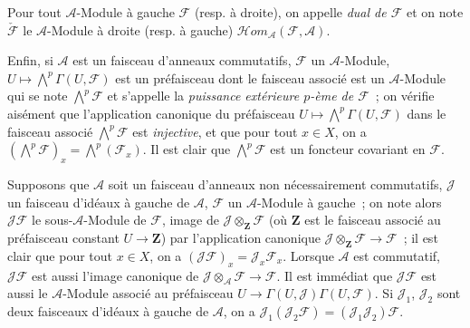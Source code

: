 \begin{env}[4.1.5]
Pour tout $\mathcal{A}$-Module à gauche $\mathcal{F}$ (resp. à droite), on
appelle \emph{dual de $\mathcal{F}$} et on note $\check{\mathcal{F}}$ le
$\mathcal{A}$-Module à droite (resp. à gauche)
$\mathcal{H}\!om_{\mathcal{A}}(\mathcal{F},\mathcal{A})$.

Enfin, si $\mathcal{A}$ est un faisceau d'anneaux commutatifs,
$\mathcal{F}$ un $\mathcal{A}$-Module,
$U\mapsto\bigwedge^p\Gamma(U,\mathcal{F})$ est un préfaisceau dont le
faisceau associé est un $\mathcal{A}$-Module qui se note
$\bigwedge^p\mathcal{F}$ et s'appelle la \emph{puissance extérieure $p$-ème
de $\mathcal{F}$}~; on vérifie aisément que l'application canonique du
préfaisceau $U\mapsto\bigwedge^p\Gamma(U,\mathcal{F})$ dans le faisceau
associé $\bigwedge^p\mathcal{F}$ est \emph{injective}, et que pour tout
$x\in X$, on a
$(\bigwedge^p\mathcal{F})_x=\bigwedge^p(\mathcal{F}_x)$. Il est clair que
$\bigwedge^p\mathcal{F}$ est un foncteur covariant en $\mathcal{F}$.
\end{env}

\begin{env}[4.1.6]
\label{0.4.1.6-fr}
Supposons que $\mathcal{A}$ soit un faisceau d'anneaux non nécessairement
commutatifs, $\mathcal{J}$ un faisceau d'idéaux à gauche de $\mathcal{A}$,
$\mathcal{F}$ un $\mathcal{A}$-Module à gauche~; on note alors
$\mathcal{J}\mathcal{F}$ le sous-$\mathcal{A}$-Module de $\mathcal{F}$,
image de $\mathcal{J}\otimes_{\mathbf Z}\mathcal{F}$ (où $\mathbf Z$ est le
faisceau associé au préfaisceau constant $U\to\mathbf Z$) par l'application
canonique $\mathcal{J}\otimes_{\mathbf Z}\mathcal{F}\to\mathcal{F}$~; il est
clair que pour tout $x\in X$, on a
$(\mathcal{J}\mathcal{F})_x=\mathcal{J}_x\mathcal{F}_x$. Lorsque
$\mathcal{A}$ est commutatif, $\mathcal{J}\mathcal{F}$ est aussi l'image
canonique de $\mathcal{J}\otimes_{\mathcal{A}}\mathcal{F}\to\mathcal{F}$.
Il est immédiat que $\mathcal{J}\mathcal{F}$ est aussi le
$\mathcal{A}$-Module associé au préfaisceau
$U\to\Gamma(U,\mathcal{J})\Gamma(U,\mathcal{F})$. Si
$\mathcal{J}_1$, $\mathcal{J}_2$ sont deux faisceaux d'idéaux à gauche de
$\mathcal{A}$, on a
$\mathcal{J}_1(\mathcal{J}_2\mathcal{F})=(\mathcal{J}_1\mathcal{J}_2)\mathcal{F}$.
\end{env}

